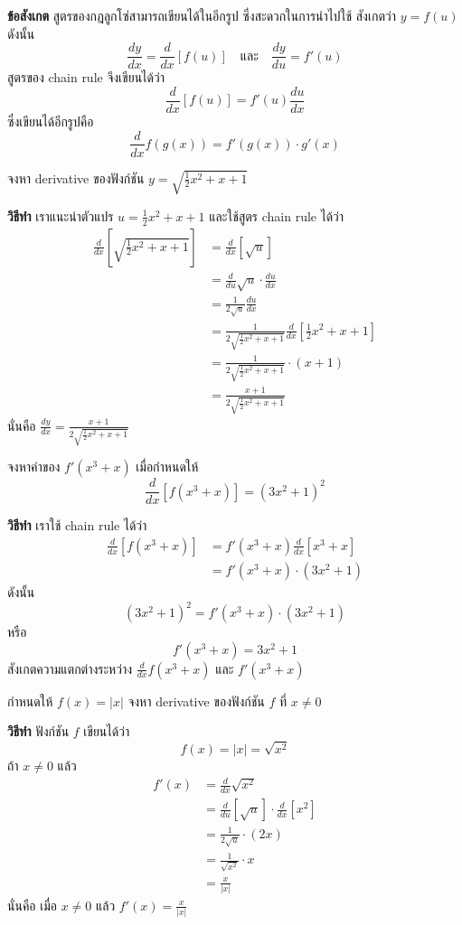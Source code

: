 \documentclass[
]{book}
\begin{document}
\textbf{ข้อสังเกต} สูตรของกฎลูกโซ่สามารถเขียนได้ในอีกรูป ซึ่งสะดวกในการนำไปใช้
สังเกตว่า \(y = f(u)\) ดังนั้น
\[\frac{dy}{dx} = \frac{d}{dx}[f(u)] \quad \text{และ} \quad
    \frac{dy}{du} = f'(u)\] สูตรของ chain rule จึงเขียนได้ว่า
\[\label{E:chain2}
\boxed{
    \frac{d}{dx}[f(u)] = f'(u)\frac{du}{dx}
}\] ซึ่งเขียนได้อีกรูปคือ \[\frac{d}{dx} f(g(x)) = f'(g(x))\cdot g'(x)\]

จงหา derivative ของฟังก์ชัน \(y = \sqrt{\frac{1}{2}x^2+x+1}\)

\textbf{วิธีทำ} เราแนะนำตัวแปร \(u = \frac{1}{2}x^2+x+1\) และใช้สูตร chain
rule ได้ว่า \begin{equation}   \begin{aligned}
    \frac{d}{dx} \left[\sqrt{\frac{1}{2}x^2+x+1} \right]
    &= \frac{d}{dx}[\sqrt{u}] \\
    &= \frac{d}{du}\sqrt{u} \cdot \frac{du}{dx} \\
    &= \frac{1}{2\sqrt{u}} \frac{du}{dx} \\
    &= \frac{1}{2\sqrt{\frac{1}{2}x^2+x+1}} \frac{d}{dx}
\left[\frac{1}{2}x^2+x+1\right] \\
    &= \frac{1}{2\sqrt{\frac{1}{2}x^2+x+1}} \cdot (x+1) \\
    &= \frac{x+1}{2\sqrt{\frac{1}{2}x^2+x+1}}
  \end{aligned} \end{equation} นั่นคือ
\(\displaystyle \frac{dy}{dx} = \frac{x+1}{2\sqrt{\frac{1}{2}x^2+x+1}}\)

จงหาค่าของ \(f'(x^3+x)\) เมื่อกำหนดให้
\[\frac{d}{dx}[f(x^3+x)] = (3x^2+1)^2\]

\textbf{วิธีทำ} เราใช้ chain rule ได้ว่า \begin{equation}   \begin{aligned}
    \frac{d}{dx}[f(x^3+x)]
    &= f'(x^3+x) \frac{d}{dx} [x^3+x] \\
    &= f'(x^3+x) \cdot (3x^2+1)
  \end{aligned} \end{equation} ดังนั้น
\[(3x^2+1)^2 = f'(x^3+x)\cdot(3x^2+1)\] หรือ \[f'(x^3+x) = 3x^2+1\]
สังเกตความแตกต่างระหว่าง \(\displaystyle \frac{d}{dx} f(x^3+x)\) และ
\(f'(x^3+x)\)

กำหนดให้ \(f(x) = |x|\) จงหา derivative ของฟังก์ชัน \(f\) ที่ \(x \ne 0\)

\textbf{วิธีทำ} ฟังก์ชัน \(f\) เขียนได้ว่า \[f(x) = |x| = \sqrt{x^2}\] ถ้า
\(x\ne 0\) แล้ว \begin{equation}   \begin{aligned}
    f'(x) &= \frac{d}{dx} \sqrt{x^2} \\
          &= \frac{d}{du} [\sqrt{u}] \cdot \frac{d}{dx} [x^2] \\
          &= \frac{1}{2\sqrt{u}} \cdot (2x) \\
          &= \frac{1}{\sqrt{x^2}} \cdot x \\
          &= \frac{x}{|x|}
  \end{aligned} \end{equation} นั่นคือ เมื่อ \(x\ne 0\) แล้ว
\(\displaystyle f'(x) = \frac{x}{|x|}\)
\end{document}
